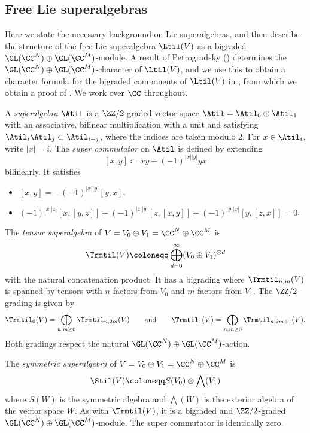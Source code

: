 \subsection{Free Lie superalgebras}\label{sec:lie-super}
Here we state the necessary background on Lie superalgebras, and then describe the structure of the free Lie superalgebra $\Ltil(V)$ as a bigraded $\GL(\CC^N) \oplus \GL(\CC^M)$-module. A result of Petrogradsky () determines the $\GL(\CC^N) \oplus \GL(\CC^M)$-character of $\Ltil(V)$, and we use this to obtain a character formula for the bigraded components of $\Ltil(V)$ in , from which we obtain a proof of . We work over $\CC$ throughout.

A \textit{superalgebra} $\Atil$ is a $\ZZ/2$-graded vector space $\Atil = \Atil_0 \oplus \Atil_1$ with an associative, bilinear multiplication with a unit and satisfying $\Atil_i \Atil_j \subset \Atil_{i+j}$, where the indices are taken modulo $2$. For $x \in \Atil_i$, write $|x| = i$. The \textit{super commutator} on $\Atil$ is defined by extending
  \[ [x, y] \coloneqq xy - (-1)^{|x||y|} yx \]
bilinearly. It satisfies 
\begin{itemize}
\item[S1.] $[x,y] = -(-1)^{|x||y|}[y,x]$,
\item[S2.] $(-1)^{|x||z|}[x,[y,z]] + (-1)^{|z||y|}[z,[x,y]] + (-1)^{|y||x|}[y,[z,x]] = 0$.
\end{itemize}

\begin{exam}
    The \textit{tensor superalgebra} of $V = V_0 \oplus V_1 = \CC^N \oplus \CC^M$ is
      \[ \Trmtil(V) \coloneqq \bigoplus_{d=0}^\infty (V_0 \oplus V_1)^{\otimes d} \]
    with the natural concatenation product. It has a bigrading where $\Trmtil_{n, m}(V)$ is spanned by tensors with $n$ factors from $V_0$ and $m$ factors from $V_1$. The $\ZZ/2$-grading is given by
      \[ \Trmtil_0(V) = \bigoplus_{n, m \geq 0} \Trmtil_{n, 2m}(V) \qquad\text{and}\qquad \Trmtil_1(V) = \bigoplus_{n, m \geq 0} \Trmtil_{n, 2m+1}(V). \]
    Both gradings respect the natural $\GL(\CC^N) \oplus \GL(\CC^M)$-action.
\end{exam}

\begin{exam}
    The \textit{symmetric superalgebra} of $V = V_0 \oplus V_1 = \CC^N \oplus \CC^M$ is
      \[ \Stil(V) \coloneqq S(V_0) \otimes \bigwedge(V_1) \]
    where $S(W)$ is the symmetric algebra and $\bigwedge(W)$ is the exterior algebra of the vector space $W$. As with $\Trmtil(V)$, it is a bigraded and $\ZZ/2$-graded $\GL(\CC^N) \oplus \GL(\CC^M)$-module. The super commutator is identically zero.
\end{exam}

